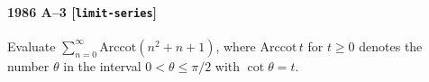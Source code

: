 \paragraph{1986 A--3 \textnormal{[\texttt{limit-series}]}}
Evaluate $\sum_{n=0}^\infty \mathrm{Arccot}(n^2+n+1)$, where
$\mathrm{Arccot}\,t$ for $t \geq 0$ denotes the number $\theta$ in the
interval $0 < \theta \leq \pi/2$ with $\cot \theta = t$.
